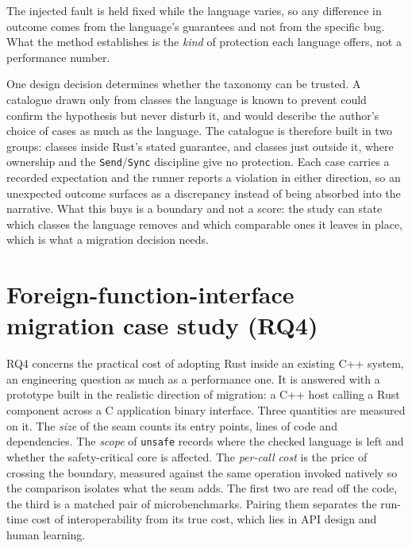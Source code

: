 \documentclass[english,oneside,a4paper,censored,csm,software-track-2020]{HYthesisML}
\begin{document}
\begin{appendices}
The injected fault is held fixed while the language varies, so any difference in outcome comes
from the language's guarantees and not from the specific bug. What the method establishes is the
\emph{kind} of protection each language offers, not a performance number.

One design decision determines whether the taxonomy can be trusted. A catalogue drawn only from
classes the language is known to prevent could confirm the hypothesis but never disturb it, and
would describe the author's choice of cases as much as the language. The catalogue is
therefore built in two groups: classes inside Rust's stated guarantee, and classes just outside
it, where ownership and the \texttt{Send}/\texttt{Sync} discipline give no protection. Each case
carries a recorded expectation and the runner reports a violation in either direction, so an
unexpected outcome surfaces as a discrepancy instead of being absorbed into the narrative. What
this buys is a boundary and not a score: the study can state which classes the language removes
and which comparable ones it leaves in place, which is what a migration decision needs.

\section{Foreign-function-interface migration case study (RQ4)}\label{sec:methodffi}
RQ4 concerns the practical cost of adopting Rust inside an existing C++ system, an engineering
question as much as a performance one. It is answered with a prototype built in the realistic
direction of migration: a C++ host calling a Rust component across a C application binary
interface. Three quantities are measured on it. The \emph{size} of the seam counts its entry
points, lines of code and dependencies. The \emph{scope} of \texttt{unsafe} records where the
checked language is left and whether the safety-critical core is affected. The \emph{per-call
cost} is the price of crossing the boundary, measured against the same operation invoked
natively so the comparison isolates what the seam adds. The first two are read off the code, the
third is a matched pair of microbenchmarks. Pairing them separates the run-time cost of
interoperability from its true cost, which lies in API design and human learning.


\end{appendices}
\end{document}
